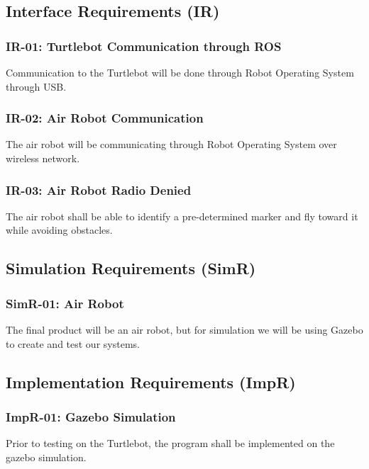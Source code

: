 \documentclass{article}
\begin{document}
	\subsection{Interface Requirements (IR)}
	
		\subsubsection{IR-01: Turtlebot Communication through ROS}
		
		Communication to the Turtlebot will be done through Robot Operating System through USB.
		
		\subsubsection{IR-02: Air Robot Communication}
		
		The air robot will be communicating through Robot Operating System over wireless network.
		
		\subsubsection{IR-03: Air Robot Radio Denied}
		
		The air robot shall be able to identify a pre-determined marker and fly toward it while avoiding obstacles.
		
	\subsection{Simulation Requirements (SimR)}
	
		\subsubsection{SimR-01: Air Robot}
		The final product will be an air robot, but for simulation we will be using Gazebo to create and test our systems. 
	
	\subsection{Implementation Requirements (ImpR)}
	
		\subsubsection{ImpR-01: Gazebo Simulation}
		
		Prior to testing on the Turtlebot, the program shall be implemented on the gazebo simulation.
		
\end{document}
